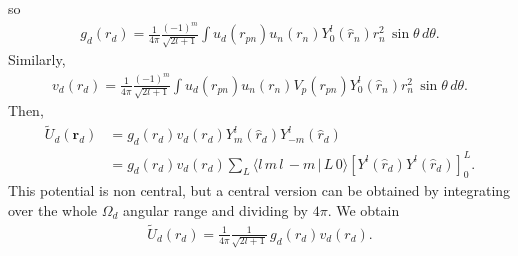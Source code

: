 \documentclass[a4paper,11pt]{article}
\begin{document}
so
  \begin{align}\label{eq93}
  g_d(r_d)=\frac{1}{4\pi}\frac{(-1)^m}{\sqrt{2l+1}}\int u_d(r_{pn})u_n(r_n)Y^l_{0}(\hat r_n)r_n^2\,\sin\theta\,d\theta.
  \end{align}
Similarly,
  \begin{align}\label{eq94}
  v_d(r_d)=\frac{1}{4\pi}\frac{(-1)^m}{\sqrt{2l+1}}\int u_d(r_{pn})u_n(r_n)V_p(r_{pn})Y^l_{0}(\hat r_n)r_n^2\,\sin\theta\,d\theta.
  \end{align}
Then,
  \begin{align}\label{eq96}
 \nonumber  \widetilde U_d(\mathbf r_d)&=g_d(r_d)v_d(r_d) Y^l_m(\hat r_d)Y^l_{-m}(\hat r_d)\\
 &=g_d(r_d)v_d(r_d)\sum_L \langle l\,m\,l\,-m\,|\,L\,0\rangle\left[Y^l(\hat r_d)Y^l(\hat r_d)\right]^L_0.
  \end{align}
This potential is non central, but a central version can be obtained by integrating over the whole $\Omega_d$ angular range and dividing by $4\pi$. We obtain
  \begin{align}\label{eq97}
   \widetilde U_d(r_d)=\frac{1}{4\pi}\frac{1}{\sqrt{2l+1}}\,g_d(r_d)v_d(r_d).
  \end{align}
\end{document}
